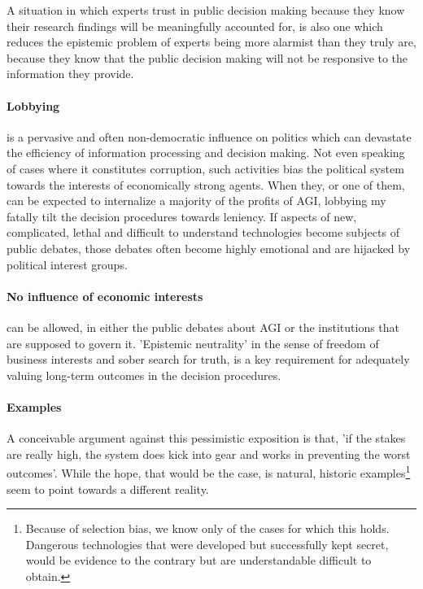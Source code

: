 \documentclass[12pt, a4paper]{article}
\begin{document}
				A situation in which experts trust in public decision making because they know their research findings will be meaningfully accounted for, is also one which reduces the epistemic problem of experts being more alarmist than they truly are, because they know that the public decision making will not be responsive to the information they provide.
				
			\paragraph{Lobbying}
				is a pervasive and often non-democratic influence on politics which can devastate the efficiency of information processing and decision making.
				Not even speaking of cases where it constitutes corruption, such activities bias the political system towards the interests of economically strong agents.
				When they, or one of them, can be expected to internalize a majority of the profits of AGI, lobbying my fatally tilt the decision procedures towards leniency.
				If aspects of new, complicated, lethal and difficult to understand technologies become subjects of public debates, those debates often become highly emotional and are hijacked by political interest groups.
				
			\paragraph{No influence of economic interests}
				can be allowed, in either the public debates about AGI or the institutions that are supposed to govern it.
				'Epistemic neutrality' in the sense of freedom of business interests and sober search for truth, is a key requirement for adequately valuing long-term outcomes in the decision procedures.

			\paragraph{Examples}
				A conceivable argument against this pessimistic exposition is that, 'if the stakes are really high, the system does kick into gear and works in preventing the worst outcomes'.
				While the hope, that would be the case, is natural, historic examples\footnote{Because of selection bias, we know only of the cases for which this holds. Dangerous technologies that were developed but successfully kept secret, would be evidence to the contrary but are understandable difficult to obtain.} seem to point towards a different reality.
				
\end{document}
